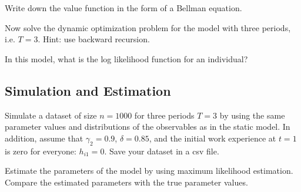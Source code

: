 \begin{exercise}
Write down the value function in the form of a Bellman equation.
\end{exercise}

\begin{exercise}
Now solve the dynamic optimization problem for the model with three periods, i.e. $T = 3$. Hint: use backward recursion.
\end{exercise}

\begin{exercise}
In this model, what is the log likelihood function for an individual?
\end{exercise}

\subsection{Simulation and Estimation}
\begin{exercise}
Simulate a dataset of size $n = 1000$ for three periods $T=3$ by using the same parameter values and distributions of the observables as in the static model. In addition, assume that $\gamma_2 = 0.9$, $\delta = 0.85$, and the initial work experience at $t=1$ is zero for everyone: $h_{i1} = 0$. Save your dataset in a csv file.
\end{exercise}

\begin{exercise}
Estimate the parameters of the model by using maximum likelihood estimation. Compare the estimated parameters with the true parameter values.
\end{exercise} 









